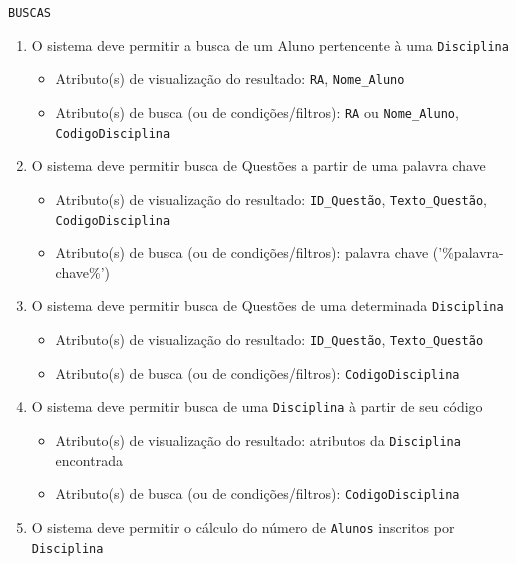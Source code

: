 \documentclass[12pt,a4paper]{article}
\begin{document}
\vspace{0.5cm}
\begin{center}
    \texttt{BUSCAS}
\end{center}
\begin{enumerate}
    \item O sistema deve permitir a busca de um Aluno pertencente à uma \texttt{Disciplina}
        \begin{itemize}
            \item Atributo(s) de visualização do resultado: {\texttt{RA}}, {\texttt{Nome\_Aluno}}
            \item Atributo(s) de busca (ou de condições/filtros): {\texttt{RA}} ou {\texttt{Nome\_Aluno}}, \texttt{CodigoDisciplina}
        \end{itemize}
    \item O sistema deve permitir busca de Questões a partir de uma palavra chave
        \begin{itemize}
            \item Atributo(s) de visualização do resultado: \texttt{ID\_Questão}, \texttt{Texto\_Questão}, \texttt{CodigoDisciplina}
            \item Atributo(s) de busca (ou de condições/filtros): palavra chave ('\%palavra-chave\%')
        \end{itemize}
    \item O sistema deve permitir busca de Questões de uma determinada \texttt{Disciplina}
        \begin{itemize}
            \item Atributo(s) de visualização do resultado: \texttt{ID\_Questão}, \texttt{Texto\_Questão}
            \item Atributo(s) de busca (ou de condições/filtros): \texttt{CodigoDisciplina}
        \end{itemize}
    \item O sistema deve permitir busca de uma \texttt{Disciplina} à partir de seu código 
        \begin{itemize}
            \item Atributo(s) de visualização do resultado: atributos da \texttt{Disciplina} encontrada
            \item Atributo(s) de busca (ou de condições/filtros): \texttt{CodigoDisciplina}
        \end{itemize}
    \item O sistema deve permitir o cálculo do número de \texttt{Alunos} inscritos por \texttt{Disciplina}

\end{enumerate}
\end{document}
